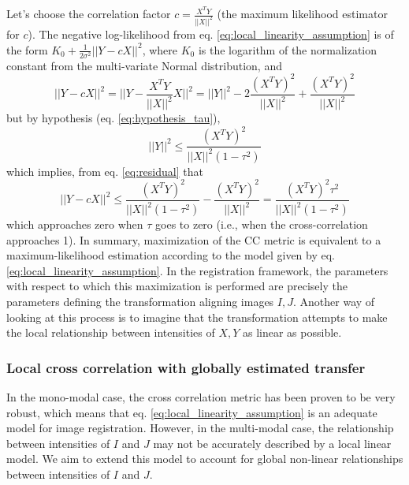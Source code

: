 Let's choose the correlation factor $c = \frac{X^{T}Y}{||X||^{2}}$ (the maximum likelihood estimator for $c$). The negative log-likelihood from eq. \eqref{eq:local_linearity_assumption} is of the form $K_{0} + \frac{1}{2\sigma^{2}}||Y - cX||^{2}$, where $K_{0}$ is the logarithm of the normalization constant from the multi-variate Normal distribution, and
\begin{equation}\label{eq:residual}
    ||Y - cX||^{2} = ||Y - \frac{X^{T}Y}{||X||^{2}}X||^{2} = ||Y||^{2} - 2\frac{(X^{T}Y)^{2}}{||X||^{2}} + \frac{(X^{T}Y)^{2}}{||X||^{2}}
\end{equation}
but by hypothesis (eq. \eqref{eq:hypothesis_tau}),
\begin{equation}
    ||Y||^{2} \leq \frac{\left(X^{T}Y\right)^{2}}{||X||^{2}(1-\tau^{2})}
\end{equation}
which implies, from eq. \eqref{eq:residual} that
\begin{equation}
    ||Y - cX||^{2} \leq \frac{\left(X^{T}Y\right)^{2}}{||X||^{2}(1-\tau^{2})} - \frac{(X^{T}Y)^{2}}{||X||^{2}} =
    \frac{(X^{T}Y)^{2}\tau^{2}}{||X||^{2}(1-\tau^{2})}
\end{equation}
which approaches zero when $\tau$ goes to zero (i.e., when the cross-correlation approaches 1). In summary, maximization of the CC metric is equivalent to a maximum-likelihood estimation according to the model given by eq. \eqref{eq:local_linearity_assumption}. In the registration framework, the parameters with respect to which this maximization is performed are precisely the parameters defining the transformation aligning images $I, J$. Another way of looking at this process is to imagine that the transformation attempts to make the local relationship between intensities of $X,Y$ as linear as possible.\\

\subsubsection{Local cross correlation with globally estimated transfer}

In the mono-modal case, the cross correlation metric has been proven to be very robust, which means that eq. \eqref{eq:local_linearity_assumption} is an adequate model for image registration. However, in the multi-modal case, the relationship between intensities of $I$ and $J$ may not be accurately described by a local linear model. We aim to extend this model to account for global non-linear relationships between intensities of $I$ and $J$.\\

